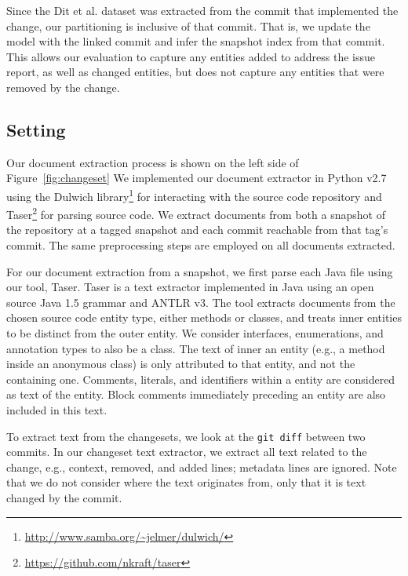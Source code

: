 Since the Dit et al. dataset was extracted from the commit that implemented the
change, our partitioning is inclusive of that commit.  That is, we update the
model with the linked commit and infer the snapshot index from that commit.
This allows our evaluation to capture any entities added to address the issue
report, as well as changed entities, but does not capture any entities that were
removed by the change.




\subsection{Setting}

Our document extraction process is shown on the left side of Figure~\ref{fig:changeset}
We implemented our document extractor in Python v2.7
using the Dulwich library\footnote{\url{http://www.samba.org/~jelmer/dulwich/}}
for interacting with the source code repository and
Taser\footnote{\url{https://github.com/nkraft/taser}} for parsing source code.
We extract documents from both a snapshot of the repository at a tagged
snapshot and each commit reachable from that tag's commit.
The same preprocessing steps are employed on all documents extracted.

For our document extraction from a snapshot, we first parse each Java file using our tool, Taser.
Taser is a text extractor implemented in Java using an open source Java 1.5 grammar and ANTLR v3.
The tool extracts documents from the chosen source code entity type,
either methods or classes, and treats inner entities to be distinct from the outer entity.
We consider interfaces, enumerations, and annotation types to also be a class.
The text of inner an entity (e.g., a method inside an anonymous class)
is only attributed to that entity, and not the containing one.
Comments, literals, and identifiers within a entity are considered as text of the entity.
Block comments immediately preceding an entity are also included in this text.

To extract text from the changesets, we look at
the \texttt{git diff} between two commits.
In our changeset text extractor, we extract all text related to the
change, e.g., context, removed, and added lines; metadata lines are ignored.
Note that we do not consider where the text originates from,
only that it is text changed by the commit.%

